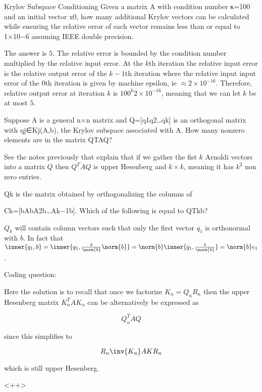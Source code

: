 \documentclass[../main.tex]{subfiles}
\begin{document}
\begin{problem}
    Krylov Subspace Conditioning
Given a matrix A with condition number κ=100 and an initial vector x0, how many additional Krylov vectors can be calculated while ensuring the relative error of each vector remains less than or equal to 1×10−6 assuming IEEE double precision.
\end{problem}
\begin{solution}
    The answer is $5$. The relative error is bounded by the condition number multiplied by the relative input error. At the $k$th iteration the relative input error is the relative output error of the $k-1$th iteration where the relative input input error of the $0$th iteration is given by machine epsilon, ie $\approx 2 \times 10^{-16}$. Therefore, relative output error at iteration $k$ is $100^k 2 \times 10^{-16}$, meaning that we can let $k$ be at most $5$.
\end{solution}

\begin{problem}
     Suppose A is a general n×n matrix and Q=[q1q2…qk] is an orthogonal matrix with qj∈Kj(A,b), the Krylov subspace associated with A. How many nonzero elements are in the matrix QTAQ?
\end{problem}
\begin{solution}
    See the notes previously that explain that if we gather the fist $k$ Arnoldi vectors into a matrix $Q$ then $Q^T A Q$ is upper Hesenberg and $k \times k$, meaning it has $k^2$ non zero entries. 
\end{solution}

\begin{problem}
    Qk is the matrix obtained by orthogonalizing the columns of

Ck=[bAbA2b…Ak−1b].
Which of the following is equal to QTkb?
\end{problem}

\begin{solution}
    $Q_k$ will contain column vectors such that only the first vector $q_1$ is orthonormal with $b$. In fact that $\inner{q_1, b} = \inner{q_1, \frac{b}{\norm{b}}\norm{b}} = \norm{b}\inner{q_1, \frac{b}{\norm{b}}} = \norm{b} e_1$.
\end{solution}

\begin{problem}
    Coding question:
\end{problem}

\begin{solution}
    Here the solution is to recall that once we factorize $K_n = Q_nR_n$ then the upper Hesenberg matrix $K_n^T A K_n$ can be alternatively be expressed as

    \[
        Q_n^T A Q
    \]

    since this simplifies to

    \[
        R_n \inv{K_n} A K R_n
    \]

    which is still upper Hesenberg.
\end{solution}<++>
\end{document}
